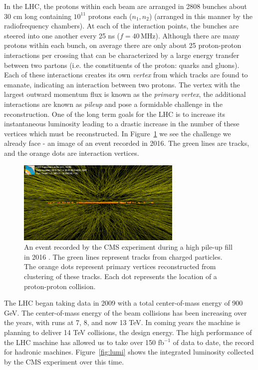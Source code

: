 In the LHC, the protons within each beam are arranged in 2808 bunches about 30 cm long containing $10^{11}$ protons each ($n_{1}, n_{2}$) (arranged in this manner by the radiofrequency chambers). At each of the interaction points, the bunches are steered into one another every 25 ns ($f=40\,\textrm{MHz}$). Although there are many protons within each bunch, on average there are only about 25 proton-proton interactions per crossing that can be characterized by a large energy transfer between two partons (i.e. the constituents of the proton: quarks and gluons). Each of these interactions creates its own \textit{vertex} from which tracks are found to emanate, indicating an interaction between two protons. The vertex with the largest outward momentum flux is known as the \textit{primary vertex}, the additional interactions are known as \textit{pileup} and pose a formidable challenge in the reconstruction. One of the long term goals for the LHC is to increase its instantaneous luminosity leading to a drastic increase in the number of these vertices which must be reconstructed. In Figure~\ref{fig:pu} we see  the challenge we already face - an image of an event recorded in 2016. The green lines are tracks, and the orange dots are interaction vertices.

\begin{figure}
\centering
\includegraphics[width=0.7\textwidth]{figs/highpileup0_4.png}
\caption[An event recorded by the CMS experiment during a high pile-up fill in 2016.]{An event recorded by the CMS experiment during a high pile-up fill in 2016 \cite{pu}. The green lines represent tracks from charged particles. The orange dots represent primary vertices reconstructed from clustering of these tracks. Each dot represents the location of a proton-proton collision.}
\label{fig:pu}
\end{figure}

The LHC began taking data in 2009 with a total center-of-mass energy of 900 GeV. The center-of-mass energy of the beam collisions has been increasing over the years, with runs at 7, 8, and now 13 TeV. In coming years the machine is planning to deliver 14 TeV collisions, the design energy. The high performance of the LHC machine has allowed us to take over 150 fb$^{-1}$ of data to date, the record for hadronic machines. Figure~\ref{fig:lumi} shows the integrated luminosity collected by the CMS experiment over this time.

